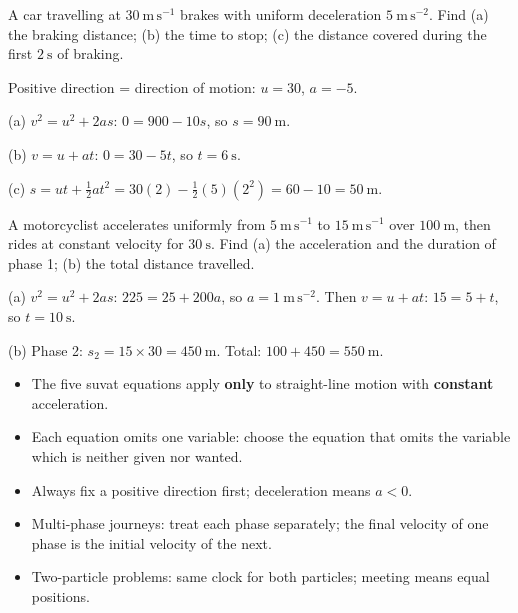 \documentclass[11pt]{article}
\begin{document}
\begin{exercice}
A car travelling at $30\ \mathrm{m\,s^{-1}}$ brakes with uniform deceleration $5\ \mathrm{m\,s^{-2}}$. Find (a) the braking distance; (b) the time to stop; (c) the distance covered during the first $2\ \mathrm{s}$ of braking.
\end{exercice}

\begin{corrige}[Exercise 1]
Positive direction = direction of motion: $u=30$, $a=-5$.

(a) $v^{2}=u^{2}+2as$: $0=900-10s$, so $s=90\ \mathrm{m}$.

(b) $v=u+at$: $0=30-5t$, so $t=6\ \mathrm{s}$.

(c) $s=ut+\tfrac12 at^{2}=30(2)-\tfrac12(5)(2^{2})=60-10=50\ \mathrm{m}$.
\end{corrige}

\begin{exercice}
A motorcyclist accelerates uniformly from $5\ \mathrm{m\,s^{-1}}$ to $15\ \mathrm{m\,s^{-1}}$ over $100\ \mathrm{m}$, then rides at constant velocity for $30\ \mathrm{s}$. Find (a) the acceleration and the duration of phase 1; (b) the total distance travelled.
\end{exercice}

\begin{corrige}[Exercise 2]
(a) $v^{2}=u^{2}+2as$: $225=25+200a$, so $a=1\ \mathrm{m\,s^{-2}}$. Then $v=u+at$: $15=5+t$, so $t=10\ \mathrm{s}$.

(b) Phase 2: $s_2=15\times 30=450\ \mathrm{m}$. Total: $100+450=550\ \mathrm{m}$.
\end{corrige}

\begin{aretenir}
\begin{itemize}
\item The five suvat equations apply \textbf{only} to straight-line motion with \textbf{constant} acceleration.
\item Each equation omits one variable: choose the equation that omits the variable which is neither given nor wanted.
\item Always fix a positive direction first; deceleration means $a<0$.
\item Multi-phase journeys: treat each phase separately; the final velocity of one phase is the initial velocity of the next.
\item Two-particle problems: same clock for both particles; meeting means equal positions.
\end{itemize}
\end{aretenir}
\end{document}
